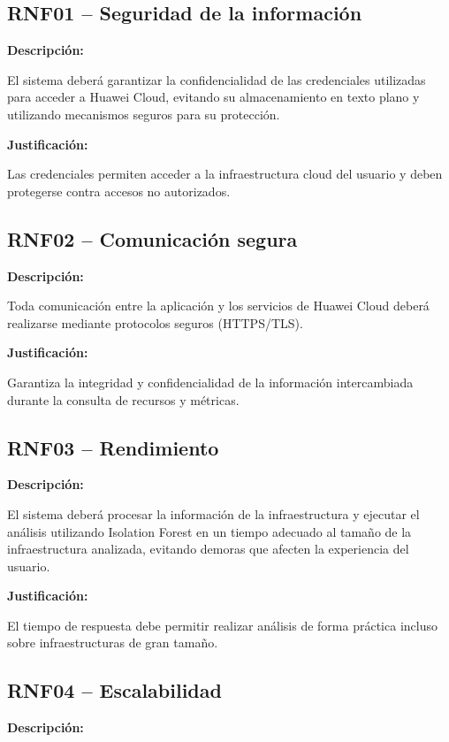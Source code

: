 \subsection{RNF01 -- Seguridad de la información}

\noindent \textbf{Descripción:}

El sistema deberá garantizar la confidencialidad de las credenciales utilizadas para acceder a Huawei Cloud, evitando su almacenamiento en texto plano y utilizando mecanismos seguros para su protección.

\noindent \textbf{Justificación:}

Las credenciales permiten acceder a la infraestructura cloud del usuario y deben protegerse contra accesos no autorizados.

\subsection{RNF02 -- Comunicación segura}

\noindent \textbf{Descripción:}

Toda comunicación entre la aplicación y los servicios de Huawei Cloud deberá realizarse mediante protocolos seguros (HTTPS/TLS).

\noindent \textbf{Justificación:}

Garantiza la integridad y confidencialidad de la información intercambiada durante la consulta de recursos y métricas.

\subsection{RNF03 -- Rendimiento}

\noindent \textbf{Descripción:}

El sistema deberá procesar la información de la infraestructura y ejecutar el análisis utilizando Isolation Forest en un tiempo adecuado al tamaño de la infraestructura analizada, evitando demoras que afecten la experiencia del usuario.

\noindent \textbf{Justificación:}

El tiempo de respuesta debe permitir realizar análisis de forma práctica incluso sobre infraestructuras de gran tamaño.

\subsection{RNF04 -- Escalabilidad}

\noindent \textbf{Descripción:}

